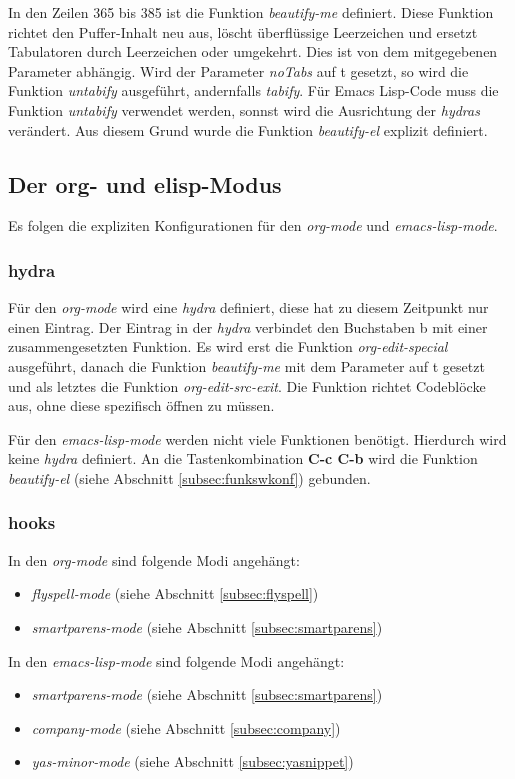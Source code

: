 In den Zeilen 365 bis 385 ist die Funktion \textit{beautify-me}
definiert. Diese Funktion richtet den Puffer-Inhalt neu aus, löscht
überflüssige Leerzeichen und ersetzt Tabulatoren durch Leerzeichen
oder umgekehrt. Dies ist von dem mitgegebenen Parameter abhängig. Wird
der Parameter \textit{noTabs} auf {\glqq}t{\grqq} gesetzt, so wird die
Funktion \textit{untabify} ausgeführt, andernfalls
\textit{tabify}. Für Emacs Lisp-Code muss die Funktion
\textit{untabify} verwendet werden, sonnst wird die Ausrichtung der
\textit{hydras} verändert. Aus diesem Grund wurde die Funktion
\textit{beautify-el} explizit definiert.\\

\subsection{Der org- und elisp-Modus}
\label{subsec:orgelispmoduskonf}
Es folgen die expliziten Konfigurationen für den \textit{org-mode} und
\textit{emacs-lisp-mode}.

\subsubsection{hydra}
Für den \textit{org-mode} wird eine \textit{hydra} definiert, diese
hat zu diesem Zeitpunkt nur einen Eintrag. Der Eintrag in der
\textit{hydra} verbindet den Buchstaben {\glqq}b{\grqq} mit einer
zusammengesetzten Funktion. Es wird erst die Funktion
\textit{org-edit-special} ausgeführt, danach die Funktion
\textit{beautify-me} mit dem Parameter auf {\glqq}t{\grqq} gesetzt und
als letztes die Funktion \textit{org-edit-src-exit}. Die Funktion
richtet Codeblöcke aus, ohne diese spezifisch öffnen zu müssen.

Für den \textit{emacs-lisp-mode} werden nicht viele Funktionen
benötigt. Hierdurch wird keine \textit{hydra} definiert. An die
Tastenkombination \textbf{C-c C-b} wird die Funktion
\textit{beautify-el} (siehe Abschnitt \ref{subsec:funkswkonf})
gebunden.

\subsubsection{hooks}
In den \textit{org-mode} sind folgende Modi angehängt:
\begin{itemize}
\item \textit{flyspell-mode} (siehe Abschnitt \ref{subsec:flyspell})
\item \textit{smartparens-mode} (siehe Abschnitt
  \ref{subsec:smartparens})\\
\end{itemize}
In den \textit{emacs-lisp-mode} sind folgende Modi angehängt:
\begin{itemize}
\item \textit{smartparens-mode} (siehe Abschnitt
  \ref{subsec:smartparens})
\item \textit{company-mode} (siehe Abschnitt \ref{subsec:company})
\item \textit{yas-minor-mode} (siehe Abschnitt
  \ref{subsec:yasnippet})\\
\end{itemize}

